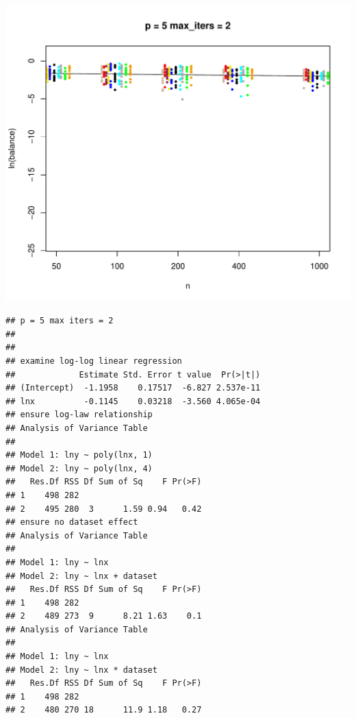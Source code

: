 \documentclass{article}\usepackage[]{graphicx}\usepackage[]{color}
\makeatletter
\def\maxwidth{ %
  \ifdim\Gin@nat@width>\linewidth
    \linewidth
  \else
    \Gin@nat@width
  \fi
}
\newenvironment{kframe}{%
 \def\at@end@of@kframe{}%
 \ifinner\ifhmode%
  \def\at@end@of@kframe{\end{minipage}}%
  \begin{minipage}{\columnwidth}%
 \fi\fi%
 \def\FrameCommand##1{\hskip\@totalleftmargin \hskip-\fboxsep
 \colorbox{shadecolor}{##1}\hskip-\fboxsep
     \hskip-\linewidth \hskip-\@totalleftmargin \hskip\columnwidth}%
 \MakeFramed {\advance\hsize-\width
   \@totalleftmargin\z@ \linewidth\hsize
   \@setminipage}}%
 {\par\unskip\endMakeFramed%
 \at@end@of@kframe}
\newenvironment{knitrout}{}{} %
\makeatother
\begin{document}
\begin{knitrout}
\includegraphics[width=\maxwidth]{figure/load_and_cleanup_data7} 
\begin{kframe}\begin{verbatim}
## p = 5 max iters = 2 
## 
## 
## examine log-log linear regression
##             Estimate Std. Error t value  Pr(>|t|)
## (Intercept)  -1.1958    0.17517  -6.827 2.537e-11
## lnx          -0.1145    0.03218  -3.560 4.065e-04
## ensure log-law relationship
## Analysis of Variance Table
## 
## Model 1: lny ~ poly(lnx, 1)
## Model 2: lny ~ poly(lnx, 4)
##   Res.Df RSS Df Sum of Sq    F Pr(>F)
## 1    498 282                         
## 2    495 280  3      1.59 0.94   0.42
## ensure no dataset effect
## Analysis of Variance Table
## 
## Model 1: lny ~ lnx
## Model 2: lny ~ lnx + dataset
##   Res.Df RSS Df Sum of Sq    F Pr(>F)
## 1    498 282                         
## 2    489 273  9      8.21 1.63    0.1
## Analysis of Variance Table
## 
## Model 1: lny ~ lnx
## Model 2: lny ~ lnx * dataset
##   Res.Df RSS Df Sum of Sq    F Pr(>F)
## 1    498 282                         
## 2    480 270 18      11.9 1.18   0.27
\end{verbatim}
\end{kframe}

\end{knitrout}
\end{document}
